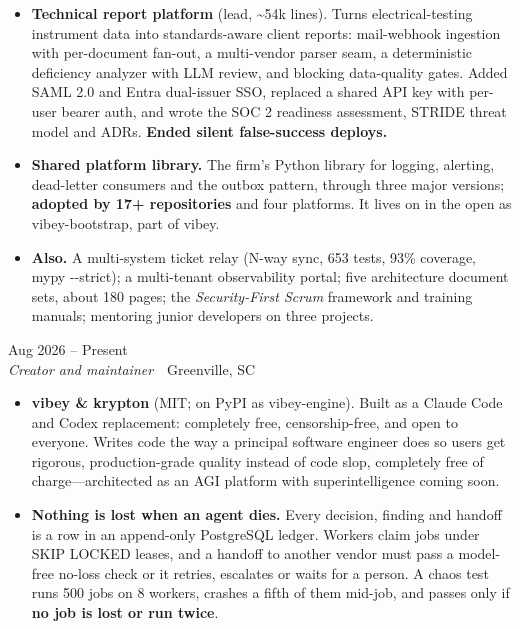 \documentclass[10pt,letterpaper]{article}
\newcommand{\szmeta}{\fontsize{8pt}{10pt}\selectfont}
\begin{document}
\begin{itemize}
\item \textbf{Technical report platform} {\color{muted}(lead, \textasciitilde{}54k lines)}. Turns electrical-testing instrument data into standards-aware client reports: mail-webhook ingestion with per-document fan-out, a multi-vendor parser seam, a deterministic deficiency analyzer with LLM review, and blocking data-quality gates. Added SAML 2.0 and Entra dual-issuer SSO, replaced a shared API key with per-user bearer auth, and wrote the SOC 2 readiness assessment, STRIDE threat model and ADRs. \textbf{Ended silent false-success deploys.}
\item \textbf{Shared platform library.} The firm's Python library for logging, alerting, dead-letter consumers and the outbox pattern, through three major versions; \textbf{adopted by 17+ repositories} and four platforms. It lives on in the open as vibey-bootstrap, part of vibey.
\item \textbf{Also.} A multi-system ticket relay (N-way sync, 653 tests, 93\% coverage, mypy -{}-strict); a multi-tenant observability portal; five architecture document sets, about 180 pages; the \textit{Security-First Scrum} framework and training manuals; mentoring junior developers on three projects.
\end{itemize}
\vspace{3pt}
 \hfill {\color{muted}\szmeta Aug 2026 – Present}\\[1pt]
{\itshape Creator and maintainer}{\color{muted}\ \textbullet\ Greenville, SC}
\vspace{2pt}
\begin{itemize}
\item \textbf{vibey \& krypton} {\color{muted}(MIT; on PyPI as vibey-engine)}. Built as a Claude Code and Codex replacement: completely free, censorship-free, and open to everyone. Writes code the way a principal software engineer does so users get rigorous, production-grade quality instead of code slop, completely free of charge—architected as an AGI platform with superintelligence coming soon.
\item \textbf{Nothing is lost when an agent dies.} Every decision, finding and handoff is a row in an append-only PostgreSQL ledger. Workers claim jobs under SKIP LOCKED leases, and a handoff to another vendor must pass a model-free no-loss check or it retries, escalates or waits for a person. A chaos test runs 500 jobs on 8 workers, crashes a fifth of them mid-job, and passes only if \textbf{no job is lost or run twice}.
\end{itemize}
\end{document}
